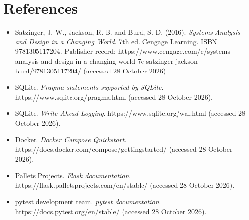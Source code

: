\section*{References}
\begin{itemize}
\item Satzinger, J. W., Jackson, R. B. and Burd, S. D. (2016). \emph{Systems Analysis and Design in a Changing World}. 7th ed. Cengage Learning. ISBN 9781305117204. Publisher record: https://www.cengage.com/c/systems-analysis-and-design-in-a-changing-world-7e-satzinger-jackson-burd/9781305117204/ (accessed 28 October 2026).

\item SQLite. \emph{Pragma statements supported by SQLite}. https://www.sqlite.org/pragma.html (accessed 28 October 2026).

\item SQLite. \emph{Write-Ahead Logging}. https://www.sqlite.org/wal.html (accessed 28 October 2026).

\item Docker. \emph{Docker Compose Quickstart}. https://docs.docker.com/compose/gettingstarted/ (accessed 28 October 2026).

\item Pallets Projects. \emph{Flask documentation}. https://flask.palletsprojects.com/en/stable/ (accessed 28 October 2026).

\item pytest development team. \emph{pytest documentation}. https://docs.pytest.org/en/stable/ (accessed 28 October 2026).

\end{itemize}
